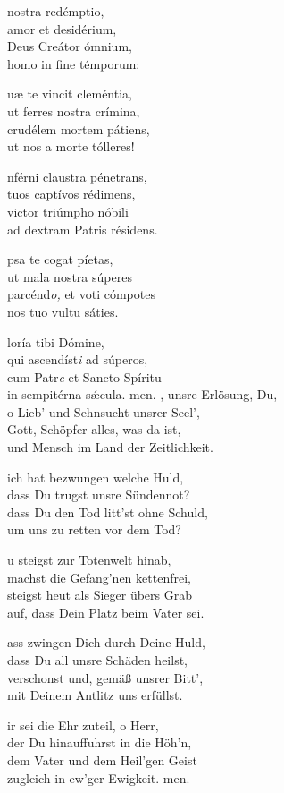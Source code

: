 \documentclass[fontsize=10pt,paper=A5,twoside,BCOR=1mm,DIV=21,headinclude]{scrarticle}
\begin{document}
\begin{paracol}{2}\pcb
\begin{hymnus}
 nostra redémptio,\\
\hspace{1.6em} amor et desidérium,\\
Deus Creátor ómnium,\\
homo in fine témporum:

uæ te vincit cleméntia,\\
ut ferres nostra crímina,\\
crudélem mortem pátiens,\\
ut nos a morte tólleres!

nférni claustra pénetrans,\\
tuos captívos rédimens,\\
victor triúmpho nóbili\\
ad dextram Patris résidens.

psa te cogat píetas,\\
ut mala nostra súperes\\
parcénd\textit{o,} et voti cómpotes\\
nos tuo vultu sáties.

loría tibi Dómine,\\
qui ascendíst\textit{i} ad súperos,\\
cum Patr\textit{e} et Sancto Spíritu\\
in sempitérna s\'æcula.
men.
	\switchcolumn
	, unsre Erlösung, Du,\\
	\hspace{1.6em} o Lieb' und Sehnsucht unsrer Seel',\\
	Gott, Schöpfer alles, was da ist,\\
	und Mensch im Land der Zeitlichkeit.

	ich hat bezwungen welche Huld,\\
	dass Du trugst unsre Sündennot?\\
	dass Du den Tod litt'st ohne Schuld,\\
	um uns zu retten vor dem Tod?

	u steigst zur Totenwelt hinab,\\
	machst die Gefang'nen kettenfrei,\\
	steigst heut als Sieger übers Grab\\
	auf, dass Dein Platz beim Vater sei.

	ass zwingen Dich durch Deine Huld,\\
	dass Du all unsre Schäden heilst,\\
	verschonst und, gemäß unsrer Bitt',\\
	mit Deinem Antlitz uns erfüllst.

	ir sei die Ehr zuteil, o Herr,\\
	der Du hinauffuhrst in die Höh'n,\\
	dem Vater und dem Heil'gen Geist\\
	zugleich in ew'ger Ewigkeit. men.
\end{hymnus}
\end{paracol}
\end{document}
